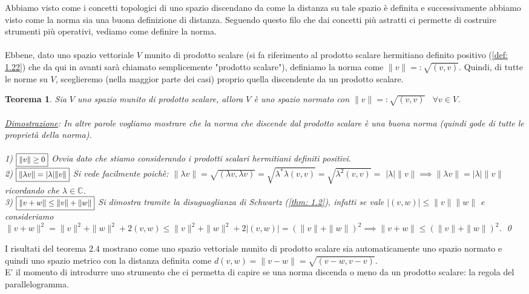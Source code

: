 \documentclass[a4paper,12pt]{report}
\newtheorem{teorema}{Teorema}[chapter]
\begin{document}
Abbiamo visto come i concetti topologici di uno spazio discendano da come la distanza su tale spazio è definita e successivamente abbiamo visto come la norma sia una buona definizione di distanza. Seguendo questo filo che dai concetti più astratti ci permette di costruire strumenti più operativi, vediamo come definire la norma. 
\\
\\ Ebbene, dato uno spazio vettoriale $V$ munito di prodotto scalare (si fa riferimento al prodotto scalare hermitiano definito positivo (\ref{def: 1.22}) che da qui in avanti sarà chiamato semplicemente "prodotto scalare"), definiamo la norma come $\| v\| =:\sqrt{(v,v)}$. Quindi, di tutte le norme su $V$, sceglieremo (nella maggior parte dei casi) proprio quella discendente da un prodotto scalare.
\\
\begin{teorema}
    Sia $V$ uno spazio munito di prodotto scalare, allora $V$ è uno spazio normato con $\|v\|=:\sqrt{(v,v)} \ \ \ \ \forall v \in V$.
    \\
    \\ \underline{Dimostrazione}: In altre parole vogliamo mostrare che la norma che discende dal prodotto scalare è una buona norma (quindi gode di tutte le proprietà della norma). 
    \\
    \\ 1) $\small\boxed{\|v\| \geq0}$  Ovvia dato che stiamo considerando i prodotti scalari hermitiani definiti positivi.
    \\ 2) $\small\boxed{\|\lambda v\|=|\lambda| \|v\|}$ Si vede facilmente poichè: \mbox{$\| \lambda v \|=\sqrt{(\lambda v, \lambda v)}=\sqrt{\lambda ^*\lambda (v,v)}= \sqrt{\lambda ^2(v,v)}=$} $|\lambda| \|v\| \implies \| \lambda v\|=|\lambda |\|v\|$ ricordando che $\lambda \in \mathbb{C}$.
    \\ 3) $\small\boxed{\|v+w\| \leq\|v\|+\|w\|}$ Si dimostra tramite la disuguaglianza di Schwartz (\ref{thm: 1.2}), infatti se vale $|(v,w)| \leq \|v\| \|w\|$ e consideriamo $\|v+w\|^2=\|v\|^2+\|w\|^2+2 (v,w)\leq \|v\|^2+\|w\|^2+2|(v,w)|=(\|v\|+\|w\|)^2  \implies \|v+w\| \leq (\|v\|+\|w\|)^2$. \qed
\end{teorema}

I risultati del teorema 2.4 mostrano come uno spazio vettoriale munito di prodotto scalare sia automaticamente uno spazio normato e quindi uno spazio metrico con la distanza definita come $d(v, w)=\|v-w\|=\sqrt{(v-w,v-v)}$.
\\ E' il momento di introdurre uno strumento che ci permetta di capire se una norma discenda o meno da un prodotto scalare: la regola del parallelogramma.
\end{document}
